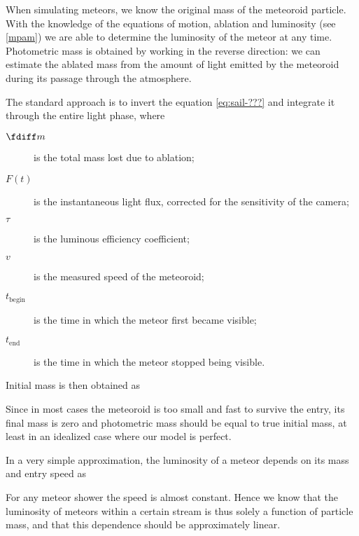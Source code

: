             When simulating meteors, we know the original mass of the meteoroid particle.
            With the knowledge of the equations of motion, ablation and luminosity (see \cref{mpam})
            we are able to determine the luminosity of the meteor at any time.
            Photometric mass is obtained by working in the reverse direction: we can estimate the
            ablated mass from the amount of light emitted by the meteoroid during its passage through the atmosphere.

            The standard approach is to invert the equation \cref{eq:sail-???} and integrate it
            through the entire light phase,
            where
            \begin{description}
                \item[$\fdiff m$]
                    is the total mass lost due to ablation;
                \item[$F(t)$]
                    is the instantaneous light flux, corrected for the sensitivity of the camera;
                \item[$\tau$]
                    is the luminous efficiency coefficient;
                \item[$v$]
                    is the measured speed of the meteoroid;
                \item[$t_\mathrm{begin}$]
                    is the time in which the meteor first became visible;
                \item[$t_\mathrm{end}$]
                    is the time in which the meteor stopped being visible.
            \end{description}

            Initial mass is then obtained as

            Since in most cases the meteoroid is too small and fast to survive the entry, its final mass is zero
            and photometric mass should be equal to true initial mass, at least in an idealized case where our model is perfect.


            In a very simple approximation, the luminosity of a meteor depends on its mass and entry speed as

            For any meteor shower the speed is almost constant. Hence we know that the luminosity of meteors
            within a certain stream is thus solely a function of particle mass, and that this dependence should
            be approximately linear.

